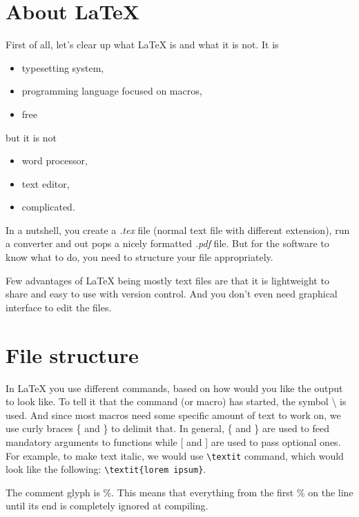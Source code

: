 \section{About LaTeX}  %

First of all, let's clear up what LaTeX is and what it is not. It is

\begin{itemize}
  \item typesetting system,
  \item programming language focused on macros,
  \item free
\end{itemize}

but it is not

\begin{itemize}
  \item word processor,
  \item text editor,
  \item complicated.
\end{itemize}

In a nutshell, you create a \textit{.tex} file (normal text file with different extension), run a converter and out pops a nicely formatted \textit{.pdf} file. But for the software to know what to do, you need to structure your file appropriately.

Few advantages of LaTeX being mostly text files are that it is lightweight to share and easy to use with version control. And you don't even need graphical interface to edit the files.

\section{File structure}

In LaTeX you use different commands, based on how would you like the output to look like. To tell it that the command (or macro) has started, the symbol \textbackslash{} is used. And since most macros need some specific amount of text to work on, we use curly braces \{ and \} to delimit that. In general, \{ and \} are used to feed mandatory arguments to functions while [ and ] are used to pass optional ones. For example, to make text italic, we would use \verb|\textit| command, which would look like the following: \verb|\textit{lorem ipsum}|.

The comment glyph is \%. This means that everything from the first \% on the line until its end is completely ignored at compiling.

